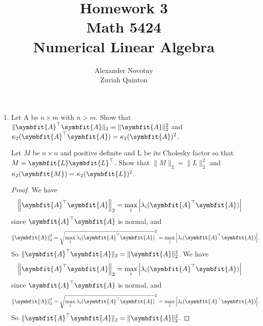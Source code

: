 \documentclass{article}
\title{Homework 3\\{\large Math 5424}\\{\large Numerical Linear Algebra}}
\author{Alexander Novotny\\Zuriah Quinton}
\theoremstyle{definition}
\newcommand{\mat}[1]{\symbfit{#1}}
\begin{document}
\maketitle

\begin{enumerate}[leftmargin=\labelsep]
	\item Let A be \(n \times m\) with \(n > m\). Show that \(\|\mat{A}^\top\mat{A}\|_2 = \|\mat{A}\|_2^2\) and \(\kappa_2 (\mat{A}^\top\mat{A}) = \kappa_2 (\mat{A})^2\).

	      Let \(M\) be \(n \times n\) and positive definite and L be its Cholesky factor so that \(M = \mat{L}\mat{L}^\top\). Show that \(\|M\|_2 = \|L\|_2^2\) and \(\kappa_2(\mat{M}) = \kappa_2(\mat{L})^2\).
	      \begin{proof}
		      We have
		      \begin{equation*}
			      \norm{\mat{A}^\top \mat{A}}_2 = \max_i \abs{ \lambda_i(\mat{A}^\top \mat{A}) } %
		      \end{equation*}
		      since \(\mat{A}^\top \mat{A}\) is normal, and
		      \begin{equation*}
			      \norm{\mat{A}}^2_2 = \sqrt{ \max_i \lambda_i(\mat{A}^\top \mat{A}) } ^2= \max_i \abs{ \lambda_i(\mat{A}^\top \mat{A}) }.
		      \end{equation*}
		      So \(\|\mat{A}^\top\mat{A}\|_2 = \|\mat{A}\|_2^2\).
		      We have
		      \begin{equation*}
			      \norm{\mat{A}^\top \mat{A}}_2 = \max_i \abs{ \lambda_i(\mat{A}^\top \mat{A}) } %
		      \end{equation*}
		      since \(\mat{A}^\top \mat{A}\) is normal, and
		      \begin{equation*}
			      \norm{\mat{A}}^2_2 = \sqrt{ \max_i \lambda_i(\mat{A}^\top \mat{A}) } ^2= \max_i \abs{ \lambda_i(\mat{A}^\top \mat{A}) }.
		      \end{equation*}
		      So \(\|\mat{A}^\top\mat{A}\|_2 = \|\mat{A}\|_2^2\).


\end{proof}
\end{enumerate}
\end{document}
